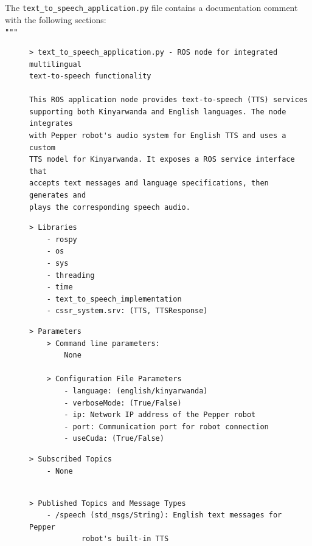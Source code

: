 \documentclass{CSSRforAfrica}
\newcommand{\checkboxChecked}{\fbox{\ding{51}}} %
\begin{document}
\noindent The {\small \verb+text_to_speech_application.py+} file contains a documentation comment with the following sections:\\

\noindent \verb+"""+

\begin{description}

\item[\checkboxChecked] 
{\small 
\begin{verbatim}
> text_to_speech_application.py - ROS node for integrated multilingual
text-to-speech functionality

This ROS application node provides text-to-speech (TTS) services
supporting both Kinyarwanda and English languages. The node integrates
with Pepper robot's audio system for English TTS and uses a custom
TTS model for Kinyarwanda. It exposes a ROS service interface that
accepts text messages and language specifications, then generates and
plays the corresponding speech audio.
\end{verbatim}}

\item[\checkboxChecked] 
{\small 
\begin{verbatim}
> Libraries
    - rospy
    - os
    - sys
    - threading
    - time
    - text_to_speech_implementation
    - cssr_system.srv: (TTS, TTSResponse)
\end{verbatim}}

\item[\checkboxChecked] 
{\small 
\begin{verbatim}
> Parameters
    > Command line parameters:
        None

    > Configuration File Parameters
        - language: (english/kinyarwanda)
        - verboseMode: (True/False)
        - ip: Network IP address of the Pepper robot
        - port: Communication port for robot connection
        - useCuda: (True/False)
\end{verbatim}}

\item[\checkboxChecked] 
{\small 
\begin{verbatim}
> Subscribed Topics 
    - None 
\end{verbatim}}

\item[\checkboxChecked] 
{\small 
\begin{verbatim}                    

> Published Topics and Message Types
    - /speech (std_msgs/String): English text messages for Pepper
            robot's built-in TTS
\end{verbatim}}



\end{description}
\end{document}
